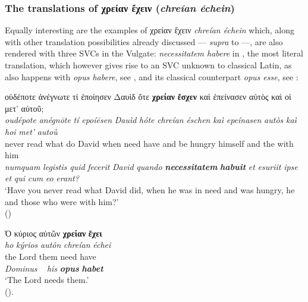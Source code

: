 \documentclass[output=paper,colorlinks,citecolor=brown]{langscibook}
\begin{document}
\z

\subsubsection{The translations of χρείαν ἔχειν (\emph{chreían échein})}\label{sec:bj:4:2:2}

Equally interesting are the examples of χρείαν ἔχειν \emph{chreían échein} which, along
with other translation possibilities already discussed  ---  \emph{supra}  to
 ---, are also rendered with three SVCs in the Vulgate: \emph{necessitatem
  habere} in , the most literal translation, which however gives rise to an SVC unknown
to classical Latin, as also happens with \emph{opus habere}, see , and its classical
counterpart \emph{opus esse}, see :


\ea\label{ex:bj:22}

\ea\label{ex:bj:22a}

\gllll οὐδέποτε ἀνέγνωτε τί ἐποίησεν Δαυὶδ ὅτε \textbf{χρείαν} \textbf{ἔσχεν} καὶ ἐπείνασεν αὐτὸς καὶ οἱ μετ' αὐτοῦ;\\
 \textit{oudépote} \textit{anégnōte} \textit{tí} \textit{epoíēsen} \textit{Dauìd} \textit{hóte} \textit{chreían} \textit{éschen} \textit{kaì} \textit{epeínasen} \textit{autòs} \textit{kaì} \textit{hoi} \textit{met'} \textit{autoù}\\
never read what do David when need have and {be hungry} himself and the with him\\
\emph{numquam} \emph{legistis} \emph{quid} \emph{fecerit} \emph{David} \emph{quando}
\textbf{\itshape necessitatem} \textbf{\itshape habuit} \emph{et} \emph{esuriit} \emph{ipse} \emph{et} \emph{qui} \emph{cum} \emph{eo} \emph{erant?}\\
\glt `Have you never read what David did, when he was in need and was hungry, he and those who were with him?' \\
\hspace*{\fill}()

\ex\label{ex:bj:22b}

\gllll  Ὁ κύριος αὐτῶν \textbf{χρείαν} \textbf{ἔχει}\\
 \textit{ho} \textit{kýrios} \textit{autôn} \textit{chreían} \textit{échei}\\
the Lord them need have\\
\emph{Dominus} ~ \emph{his} \textbf{\itshape opus} \textbf{\itshape habet}\\
\glt `The Lord needs them.' \\
\hspace*{\fill}(). 
\end{document}
